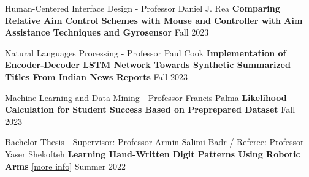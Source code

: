   \begin{cventries}
    \cventry
    {Human-Centered Interface Design - Professor Daniel J. Rea}
    {\textbf {Comparing Relative Aim Control Schemes with Mouse and Controller with Aim Assistance Techniques and Gyrosensor}
    }
    {}
    {Fall 2023}
    {}
    \vspace{0.0 cm}

  \end{cventries}
  \begin{cventries}
    \cventry
    {Natural Languages Processing - Professor Paul Cook}
    {\textbf {Implementation of Encoder-Decoder LSTM Network Towards Synthetic Summarized Titles From Indian News Reports}}
    {}
    {Fall 2023}
    {}
    \vspace{0.0 cm}
  
  \end{cventries}
  \begin{cventries}
    \cventry
    {Machine Learning and Data Mining - Professor Francis Palma}
    {\textbf {Likelihood Calculation for Student Success Based on Preprepared Dataset}}
    {}
    {Fall 2023}
    {}
    \vspace{0.0 cm}
  
  
  \end{cventries}
  \begin{cventries}
    \cventry
    {Bachelor Thesis - Supervisor: Professor Armin Salimi-Badr / Referee: Professor Yaser Shekofteh}
    {\textbf {Learning Hand-Written Digit Patterns Using Robotic Arms}
    \href{https://ph504.github.io/projects/projects-1/}{\textcolor{cobalt}{[more info]}}}
    {}
    {Summer 2022}
    {}
    \vspace{0.0 cm}
  \end{cventries}
